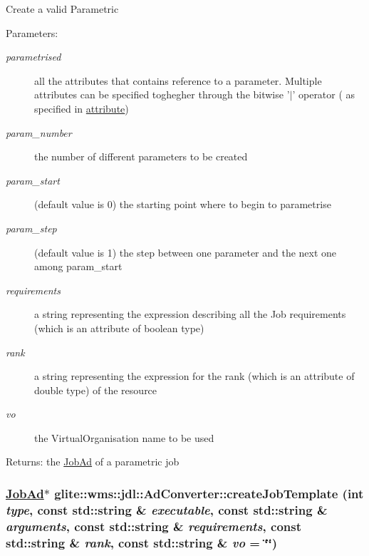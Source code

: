 Create a valid Parametric \begin{Desc}
\item[Parameters:]
\begin{description}
\item[{\em parametrised}]all the attributes that contains reference to a parameter. Multiple attributes can be specified toghegher through the bitwise '$|$' operator ( as specified in \hyperlink{classglite_1_1wms_1_1jdl_1_1AdConverter_w10}{attribute}) \item[{\em param\_\-number}]the number of different parameters to be created \item[{\em param\_\-start}](default value is 0) the starting point where to begin to parametrise \item[{\em param\_\-step}](default value is 1) the step between one parameter and the next one among param\_\-start \item[{\em requirements}]a string representing the expression describing all the Job requirements (which is an attribute of boolean type) \item[{\em rank}]a string representing the expression for the rank (which is an attribute of double type) of the resource \item[{\em vo}]the Virtual\-Organisation name to be used \end{description}
\end{Desc}
\begin{Desc}
\item[Returns:]the \hyperlink{classglite_1_1wms_1_1jdl_1_1JobAd}{Job\-Ad} of a parametric job \end{Desc}
\hypertarget{classglite_1_1wms_1_1jdl_1_1AdConverter_z21_0}{
\subsubsection[createJobTemplate]{\setlength{\rightskip}{0pt plus 5cm}\hyperlink{classglite_1_1wms_1_1jdl_1_1JobAd}{Job\-Ad}$\ast$ glite::wms::jdl::Ad\-Converter::create\-Job\-Template (int {\em type}, const std::string \& {\em executable}, const std::string \& {\em arguments}, const std::string \& {\em requirements}, const std::string \& {\em rank}, const std::string \& {\em vo} = \char`\"{}\char`\"{})}}
\label{classglite_1_1wms_1_1jdl_1_1AdConverter_z21_0}


